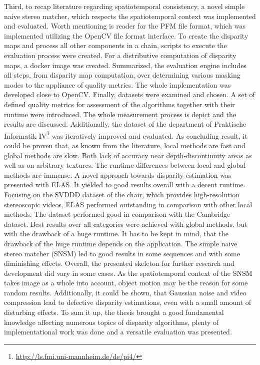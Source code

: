 Third, to recap literature regarding spatiotemporal consistency, a novel simple naive stereo matcher, which respects the spatiotemporal context was implemented and evaluated.
Worth mentioning is reader for the PFM file format, which was implemented utilizing the OpenCV file format interface.
To create the disparity maps and process all other components in a chain, scripts to execute the evaluation process were created.
For a distributive computation of disparity maps, a docker image was created.
Summarized, the evaluation engine includes all steps, from disparity map computation, over determining various masking modes to the appliance of quality metrics.
The whole implementation was developed close to OpenCV.
\newline\newline\noindent Finally, datasets were examined and chosen.
A set of defined quality metrics for assessment of the algorithms together with their runtime were introduced.
The whole measurement process is depict and the results are discussed.
Additionally, the dataset of the department of Praktische Informatik IV\footnote{\url{http://ls.fmi.uni-mannheim.de/de/pi4/}} was iteratively improved and evaluated.
As concluding result, it could be proven that, as known from the literature, local methods are fast and global methods are slow.
Both lack of accuracy near depth-discontinuity areas as well as on arbitrary textures.
The runtime differences between local and global methods are immense.
A novel approach towards disparity estimation was presented with ELAS.
It yielded to good results overall with a decent runtime.
Focusing on the SVDDD dataset of the chair, which provides high-resolution stereoscopic videos, ELAS performed outstanding in comparison with other local methods.
The dataset performed good in comparison with the Cambridge dataset.
Best results over all categories were achieved with global methods, but with the drawback of a huge runtime.
It has to be kept in mind, that the drawback of the huge runtime depends on the application.
The simple naive stereo matcher (SNSM) led to good results in some sequences and with some diminishing effects.
Overall, the presented skeleton for further research and development did vary in some cases.
As the spatiotemporal context of the SNSM takes image as a whole into account, object motion may be the reason for some random results.
Additionally, it could be shown, that Gaussian noise and video compression lead to defective disparity estimations, even with a small amount of disturbing effects.
To sum it up, the thesis brought a good fundamental knowledge affecting numerous topics of disparity algorithms, plenty of implementational work was done and a versatile evaluation was presented.

